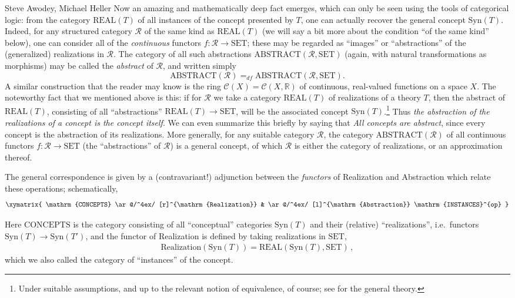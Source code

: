 \begin{artengenv2auth}{Steve Awodey, Michael Heller}
Now an amazing and mathematically deep fact emerges, which can only be seen using the tools of categorical logic: from the category  $\mathrm{REAL}(T) $ of all instances of the concept presented by $T$, one can actually recover the general concept $\mathrm{Syn}(T)$.  Indeed, for any structured category $\mathcal{R}$ of the same kind as $\mathrm{REAL}(T)$ (we will say a bit more about the condition ``of the same kind'' below), one can consider all of the \emph{continuous} functors $f : \mathcal{R} \to \mathrm{SET}$; these may be regarded as ``images'' or ``abstractions'' of the (generalized) realizations in $\mathcal{R}$.  The category of all such abstractions $\mathrm{ABSTRACT}(\mathcal{R}, \mathrm{SET})$ (again, with natural transformations as morphisms) may be called the \emph{abstract} of $\mathcal{R}$, and written simply 
$$
\mathrm{ABSTRACT}(\mathcal{R}) =_{df}  \mathrm{ABSTRACT}(\mathcal{R}, \mathrm{SET}).
$$
A similar construction that the reader may know is the ring $\mathcal{C}(X) = \mathcal{C}(X, \mathbb{R})$ of continuous, real-valued functions on a space $X$. The noteworthy fact that we mentioned above is this: if for $\mathcal{R}$ we take a category $\mathrm{REAL}(T) $ of realizations of a theory $T$, then the abstract of $\mathrm{REAL}(T) $, consisting of all ``abstractions'' $\mathrm{REAL}(T) \to \mathrm{SET}$, will be the associated concept $\mathrm{Syn}(T)$.\footnote{Under suitable assumptions, and up to the relevant notion of equivalence, of course; see \parencite{Awodey2019} for the general theory.}   Thus \emph{the abstraction of the realizations of a concept is the concept itself}.  We can even summarize this briefly by saying that \emph{All concepts are abstract}, since every concept is the abstraction of its realizations.  More generally, for any suitable category $\mathcal{R}$, the category $\mathrm{ABSTRACT}(\mathcal{R})$ of all continuous functors $f : \mathcal{R} \to \mathrm{SET}$ (the ``abstractions'' of $\mathcal{R}$) is a general concept, of which $\mathcal{R}$ is either the category of realizations, or an approximation thereof.  

The general correspondence is given by a (contravariant!) adjunction between the \emph{functors} of Realization and Abstraction which relate these operations; schematically,
\[
\xymatrix{
\mathrm{CONCEPTS}  \ar@/^4ex/ [r]^{\mathrm{Realization}} & \ar@/^4ex/ [l]^{\mathrm{Abstraction}} \mathrm{INSTANCES}^{op}
}
\]

Here $\mathrm{CONCEPTS}$ is the category consisting of all ``conceptual'' categories $\mathrm{Syn}(T)$ and their (relative) ``realizations'', i.e.\ functors  $\mathrm{Syn}(T) \to \mathrm{Syn}(T')$, and the functor of Realization is defined by taking realizations in $\mathrm{SET}$,
\begin{align*}
\mathrm{Realization}(\mathrm{Syn}(T)) = \mathrm{REAL}(\mathrm{Syn}(T), \mathrm{SET})\,,
\end{align*}
which we also called the category of ``instances'' of the concept. 


\end{artengenv2auth}
